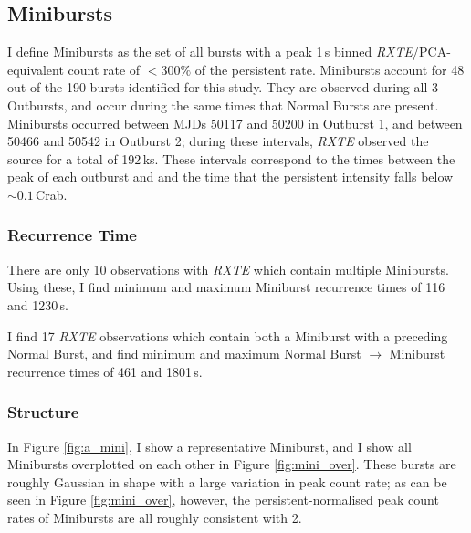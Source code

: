 \subsection{Minibursts}

\par I define Minibursts as the set of all bursts with a peak 1\,s binned \textit{RXTE}/PCA-equivalent count rate of $<300\%$ of the persistent rate.  Minibursts account for 48 out of the 190 bursts identified for this study.  They are observed during all 3 Outbursts, and occur during the same times that Normal Bursts are present.  Minibursts occurred between MJDs 50117 and 50200 in Outburst 1, and between 50466 and 50542 in Outburst 2; during these intervals, \textit{RXTE} observed the source for a total of 192\,ks.  These intervals correspond to the times between the peak of each outburst and and the time that the persistent intensity falls below $\sim0.1$\,Crab.

\subsubsection{Recurrence Time}

\par There are only 10 observations with \textit{RXTE} which contain multiple Minibursts.  Using these, I find minimum and maximum Miniburst recurrence times of 116 and 1230\,s.
\par I find 17 \textit{RXTE} observations which contain both a Miniburst with a preceding Normal Burst, and find minimum and maximum Normal Burst $\rightarrow$ Miniburst recurrence times of 461 and 1801\,s.

\subsubsection{Structure}

\par In Figure \ref{fig:a_mini}, I show a representative Miniburst, and I show all Minibursts overplotted on each other in Figure \ref{fig:mini_over}.  These bursts are roughly Gaussian in shape with a large variation in peak count rate; as can be seen in Figure \ref{fig:mini_over}, however, the persistent-normalised peak count rates of Minibursts are all roughly consistent with 2.

